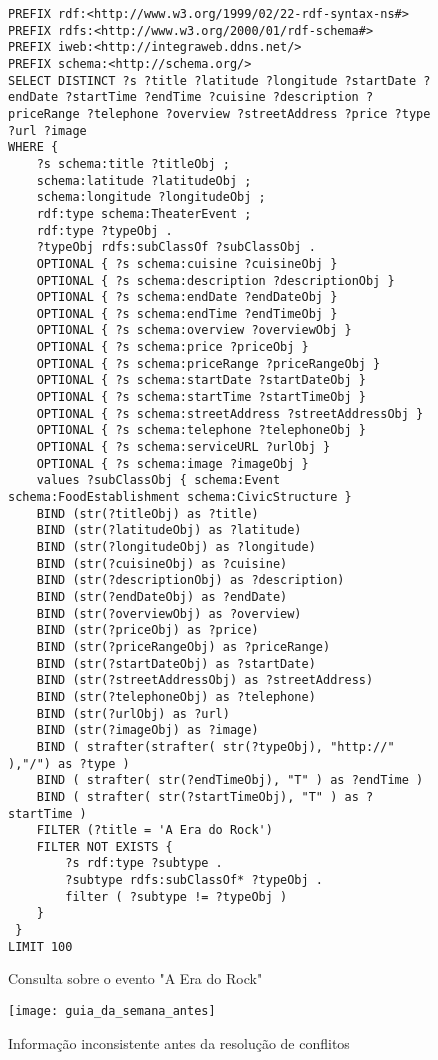 \begin{figure}[!htbp]
    \begin{lstlisting}[language=SPARQL]
PREFIX rdf:<http://www.w3.org/1999/02/22-rdf-syntax-ns#>
PREFIX rdfs:<http://www.w3.org/2000/01/rdf-schema#>
PREFIX iweb:<http://integraweb.ddns.net/>
PREFIX schema:<http://schema.org/>
SELECT DISTINCT ?s ?title ?latitude ?longitude ?startDate ?endDate ?startTime ?endTime ?cuisine ?description ?priceRange ?telephone ?overview ?streetAddress ?price ?type ?url ?image 
WHERE {
	?s schema:title ?titleObj ;
	schema:latitude ?latitudeObj ;
	schema:longitude ?longitudeObj ;
	rdf:type schema:TheaterEvent ;
	rdf:type ?typeObj .
	?typeObj rdfs:subClassOf ?subClassObj .
	OPTIONAL { ?s schema:cuisine ?cuisineObj }
	OPTIONAL { ?s schema:description ?descriptionObj }
	OPTIONAL { ?s schema:endDate ?endDateObj }
	OPTIONAL { ?s schema:endTime ?endTimeObj }	
	OPTIONAL { ?s schema:overview ?overviewObj }
	OPTIONAL { ?s schema:price ?priceObj }	
	OPTIONAL { ?s schema:priceRange ?priceRangeObj }
	OPTIONAL { ?s schema:startDate ?startDateObj }
	OPTIONAL { ?s schema:startTime ?startTimeObj }
	OPTIONAL { ?s schema:streetAddress ?streetAddressObj }	
	OPTIONAL { ?s schema:telephone ?telephoneObj }
	OPTIONAL { ?s schema:serviceURL ?urlObj }
	OPTIONAL { ?s schema:image ?imageObj }
	values ?subClassObj { schema:Event schema:FoodEstablishment schema:CivicStructure } 
	BIND (str(?titleObj) as ?title)
	BIND (str(?latitudeObj) as ?latitude)
	BIND (str(?longitudeObj) as ?longitude)
	BIND (str(?cuisineObj) as ?cuisine)
	BIND (str(?descriptionObj) as ?description)
	BIND (str(?endDateObj) as ?endDate)
	BIND (str(?overviewObj) as ?overview)
	BIND (str(?priceObj) as ?price)
	BIND (str(?priceRangeObj) as ?priceRange)
	BIND (str(?startDateObj) as ?startDate)
	BIND (str(?streetAddressObj) as ?streetAddress)
	BIND (str(?telephoneObj) as ?telephone)
	BIND (str(?urlObj) as ?url)
	BIND (str(?imageObj) as ?image)
	BIND ( strafter(strafter( str(?typeObj), "http://" ),"/") as ?type )
	BIND ( strafter( str(?endTimeObj), "T" ) as ?endTime )
	BIND ( strafter( str(?startTimeObj), "T" ) as ?startTime )
	FILTER (?title = 'A Era do Rock')
	FILTER NOT EXISTS {
		?s rdf:type ?subtype .
		?subtype rdfs:subClassOf* ?typeObj .
		filter ( ?subtype != ?typeObj )
	}	
 }
LIMIT 100
    \end{lstlisting}
    \caption{Consulta sobre o evento "A Era do Rock"}
    \label{fig:sparql_era_do_rock} 
\end{figure}

\begin{figure}[!ht]
  \centering
  \texttt{[image: guia\_da\_semana\_antes]} 
  \caption{Informação inconsistente antes da resolução de conflitos}
  \label{fig:guia_da_semana_antes} 
\end{figure}

